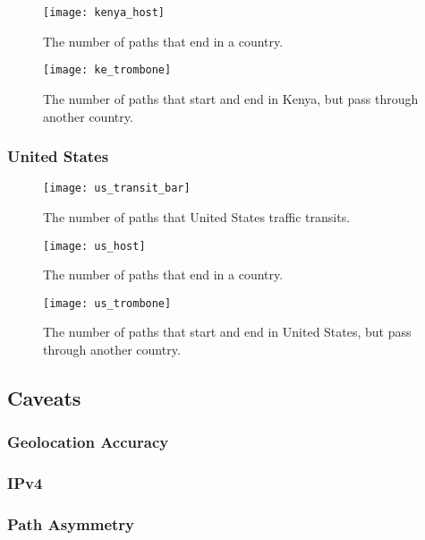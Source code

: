 \begin{figure}[t!]
\centering
\texttt{[image: kenya\_host]}
\caption{The number of paths that end in a country.}
\label{fig:host}
\end{figure} 

\begin{figure}
\centering
\texttt{[image: ke\_trombone]}
\caption{The number of paths that start and end in Kenya, but pass through another country.}
\label{fig:trombone}
\end{figure}

\subsubsection{United States}

\begin{figure}
\centering
\texttt{[image: us\_transit\_bar]}
\caption{The number of paths that United States traffic transits.}
\label{fig:transit}
\end{figure}

\begin{figure}[t!]
\centering
\texttt{[image: us\_host]}
\caption{The number of paths that end in a country.}
\label{fig:host}
\end{figure} 

\begin{figure}
\centering
\texttt{[image: us\_trombone]}
\caption{The number of paths that start and end in United States, but pass through another country.}
\label{fig:trombone}
\end{figure}

\subsection{Caveats}

\subsubsection{Geolocation Accuracy}

\subsubsection{IPv4}

\subsubsection{Path Asymmetry}


